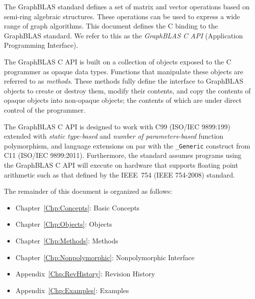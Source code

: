 \documentclass[11pt]{extbook}
\begin{document}
The GraphBLAS standard defines a set of matrix and vector operations 
%
based on semi-ring algebraic structures.  
These operations can be used
to express a wide range of graph algorithms.   This document 
defines the C binding to the GraphBLAS standard.   We refer to 
this as the {\it GraphBLAS C API} (Application Programming Interface).   

The GraphBLAS C API is built on a collection of   
objects exposed to the C programmer as opaque data types. 
Functions that manipulate these
objects are referred to as {\it methods}.  These methods fully define the 
interface to GraphBLAS objects to create or destroy them, modify their 
contents, and copy the contents of opaque objects into non-opaque objects; the 
contents of which are under direct control of the programmer.

The GraphBLAS C API is designed to work with C99 (ISO/IEC 9899:199) 
extended with {\it static type-based} and {\it number of parameters-based}
function polymorphism, and language extensions on par with 
the {\tt \_Generic} construct from C11 (ISO/IEC 9899:2011).  
Furthermore, the standard assumes programs using the GraphBLAS C API
will execute on hardware that supports floating point arithmetic
such as that defined by the IEEE~754 (IEEE 754-2008) standard. 

The remainder of this document is organized as follows:
\begin{itemize}
\item Chapter~\ref{Chp:Concepts}: Basic Concepts
\item Chapter~\ref{Chp:Objects}: Objects
\item Chapter~\ref{Chp:Methods}: Methods
\item Chapter~\ref{Chp:Nonpolymorphic}: Nonpolymorphic Interface
\item Appendix~\ref{Chp:RevHistory}: Revision History
\item Appendix~\ref{Chp:Examples}: Examples
\end{itemize}

\end{document}
